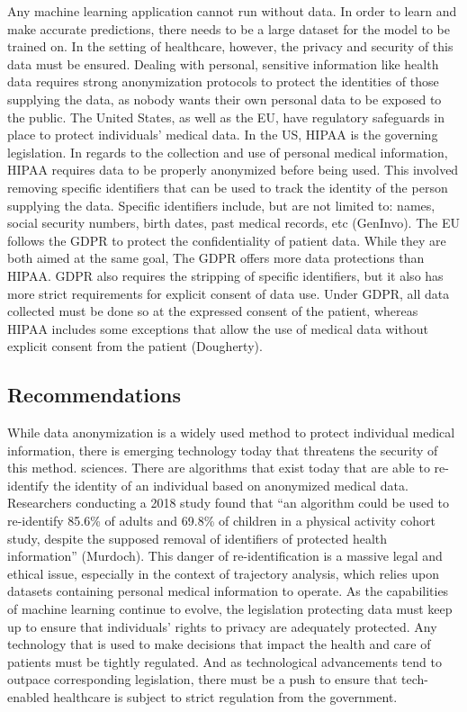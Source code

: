 \documentclass{article}
\begin{document}
Any machine learning application cannot run without data.  In order to learn and make accurate predictions, there needs to be a large dataset for the model to be trained on.  In the setting of healthcare, however, the privacy and security of this data must be ensured.  Dealing with personal, sensitive information like health data requires strong anonymization protocols to protect the identities of those supplying the data, as nobody wants their own personal data to be exposed to the public.  The United States, as well as the EU, have regulatory safeguards in place to protect individuals’ medical data.  In the US, HIPAA is the governing legislation.  In regards to the collection and use of personal medical information, HIPAA requires data to be properly anonymized before being used.  This involved removing specific identifiers that can be used to track the identity of the person supplying the data.  Specific identifiers include, but are not limited to: names, social security numbers, birth dates, past medical records, etc (GenInvo).  The EU follows the GDPR to protect the confidentiality of patient data.  While they are both aimed at the same goal, The GDPR offers more data protections than HIPAA.  GDPR also requires the stripping of specific identifiers, but it also has more strict requirements for explicit consent of data use.  Under GDPR, all data collected must be done so at the expressed consent of the patient, whereas HIPAA includes some exceptions that allow the use of medical data without explicit consent from the patient (Dougherty).

\subsection{Recommendations}
While data anonymization is a widely used method to protect individual medical information, there is emerging technology today that threatens the security of this method.  sciences.   There are algorithms that exist today that are able to re-identify the identity of an individual based on anonymized medical data. Researchers conducting a 2018 study found that “an algorithm could be used to re-identify 85.6\% of adults and 69.8\% of children in a physical activity cohort study, despite the supposed removal of identifiers of protected health information” (Murdoch).  This danger of re-identification is a massive legal and ethical issue, especially in the context of trajectory analysis, which relies upon datasets containing personal medical information to operate.  As the capabilities of machine learning continue to evolve, the legislation protecting data must keep up to ensure that individuals’ rights to privacy are adequately protected.  Any technology that is used to make decisions that impact the health and care of patients must be tightly regulated.  And as technological advancements tend to outpace corresponding legislation, there must be a push to ensure that tech-enabled healthcare is subject to strict regulation from the government.
\newpage
\end{document}
